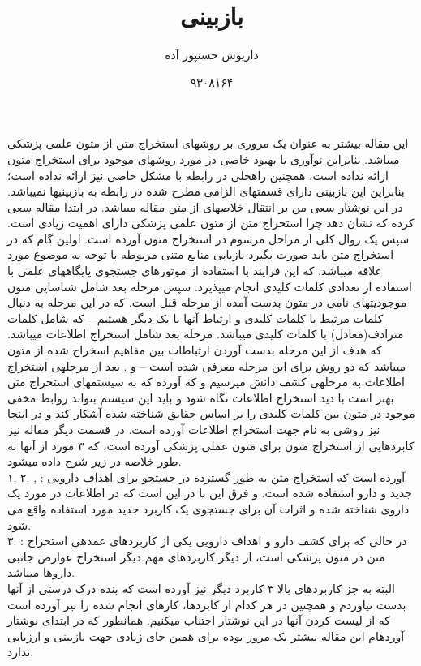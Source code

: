 \documentclass[10pt,a4paper]{article}
\newcommand{\نیمفاصله}{\halfspace}
\renewcommand{\ }{\halfspace}
\begin{document}
\title{بازبینی\\
}
\author{داریوش حسن\ پور آده}
\date{۹۳۰۸۱۶۴}
\maketitle
\null
\vfill
\thispagestyle{empty}
\setcounter{page}{0}
\newpage
این مقاله بیشتر به عنوان یک مروری بر روش\ های استخراج متن از متون علمی پزشکی می\ باشد. بنابراین نوآوری یا بهبود خاصی در مورد روش\ های موجود برای استخراج متون ارائه نداده است، همچنین راه\ حلی در رابطه با مشکل خاصی نیز ارائه نداده است؛ بنابراین این بازبینی دارای قسمت\ های الزامی مطرح شده در رابطه به بازبینی\ ها نمی\ باشد. در این نوشتار سعی من بر انتقال خلاصه\ ای از متن مقاله می\ باشد.
در ابتدا مقاله سعی کرده که نشان دهد چرا استخراج متن از متون علمی پزشکی دارای اهمیت زیادی است. سپس یک روال کلی از مراحل مرسوم در استخراج متون آورده است. اولین گام  که در استخراج متن  باید صورت بگیرد بازیابی منابع متنی مربوطه با توجه به موضوع مورد علاقه می\ باشد. که این فرایند با استفاده از موتورهای جستجوی پایگاه\ های علمی با استفاده از تعدادی کلمات کلیدی انجام می\ پذیرد. سپس مرحله بعد شامل شناسایی متون موجودیت\ های نامی در متون بدست آمده از مرحله قبل است. که در این مرحله به دنبال کلمات مرتبط با کلمات کلیدی و ارتباط آنها با یک دیگر هستیم -- که شامل کلمات مترادف(معادل) با کلمات کلیدی می\ باشد. مرحله بعد شامل استخراج اطلاعات می\ باشد. که هدف از این مرحله بدست آوردن ارتباطات بین مفاهیم اسخراج شده از متون می\ باشد که دو روش برای این مرحله معرفی شده است --
 و .
بعد از مرحله\ ی استخراج اطلاعات به مرحله\ ی کشف دانش می\ رسیم و که آورده که به سیستم\ های استخراج متن بهتر است با دید استخراج اطلاعات نگاه شود و باید این سیستم بتواند روابط مخفی موجود در متون بین کلمات کلیدی را بر اساس حقایق شناخته شده آشکار کند و در اینجا نیز روشی به نام
جهت استخراج اطلاعات آورده است.
در قسمت دیگر مقاله نیز کابردهایی از استخراج متون برای متون عملی پزشکی آورده است، که ۳ مورد از آنها به طور خلاصه در زیر شرح داده می\ شود.\\
۱, ۲. , :
آورده است که استخراج متن به طور گسترده در جستجو برای اهداف دارویی جدید و دارو استفاده شده است. و فرق این با  در این است که در  اطلاعات در مورد یک داروی شناخته شده و اثرات آن برای جستجوی یک کاربرد جدید مورد استفاده واقع می شود.\\
۳. :
در حالی که برای کشف دارو و اهداف دارویی یکی از کاربردهای عمده\ ی استخراج متن در متون پزشکی است، از دیگر کاربردهای مهم دیگر استخراج عوارض جانبی داروها می\ باشد.\\
البته به جز کاربردهای بالا ۳ کاربرد دیگر نیز آورده است که بنده درک درستی از آنها بدست نیاوردم و همچنین در هر کدام از کابردها، کارهای انجام شده را نیز آورده است که از لیست کردن آنها در این نوشتار اجتناب می\ کنیم.
همانطور که در ابتدای نوشتار آورده\ ام این مقاله بیشتر یک مرور بوده برای همین جای زیادی جهت بازبینی و ارزیابی ندارد.
\end{document}
